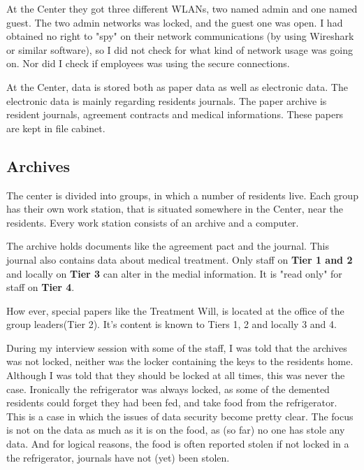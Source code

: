 \documentclass[11pt]{article}
\begin{document}
At the Center they got three different WLANs, two named admin and one named guest. The two admin networks was locked, and the guest one was open. I had obtained no right to "spy" on their network communications (by using Wireshark or similar software), so I did not check for what kind of network usage was going on. Nor did I check if employees was using the secure connections.

At the Center, data is stored both as paper data as well as electronic data. The electronic data is mainly regarding residents journals. The paper archive is resident journals, agreement contracts and medical informations. These papers are kept in file cabinet.
\subsection{Archives}
The center is divided into groups, in which a number of residents live. Each group has their own work station, that is situated somewhere in the Center, near the residents. Every work station consists of an archive and a computer.

The archive holds documents like the agreement pact and the journal. This journal also contains data about medical treatment. Only staff on \textbf{Tier 1 and 2} and locally on \textbf{Tier 3} can alter in the medial information. It is "read only" for staff on \textbf{Tier 4}.

How ever, special papers like the Treatment Will, is located at the office of the group leaders(Tier 2). It's content is known to Tiers 1, 2 and locally 3 and 4.

During my interview session with some of the staff, I was told that the archives was not locked, neither was the locker containing the keys to the residents home. Although I was told that they should be locked at all times, this was never the case. Ironically the refrigerator was always locked, as some of the demented residents could forget they had been fed, and take food from the refrigerator.
This is a case in which the issues of data security become pretty clear. The focus is not on the data as much as it is on the food, as (so far) no one has stole any data. And for logical reasons, the food is often reported stolen if not locked in a the refrigerator, journals have not (yet) been stolen.
\end{document}
